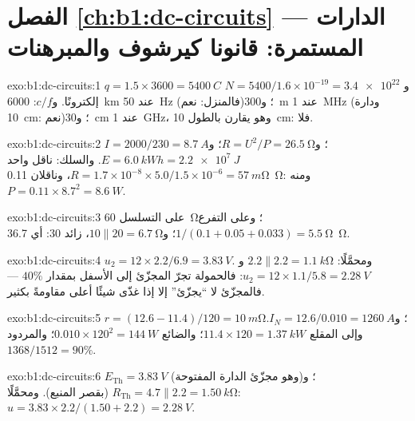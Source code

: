 \section*{الفصل \ref{ch:b1:dc-circuits} --- الدارات المستمرة: قانونا كيرشوف والمبرهنات}

\begin{solution}{exo:b1:dc-circuits:1}
$q = 1.5 \times 3600 = \qty{5400}{C}$ و $N = 5400/1.6\times10^{-19} =
\num{3.4e22}$ إلكترونًا. و$c/f$: \qty{6000}{km} عند \qty{50}{Hz} (فالمنزل:
نعم)؛ و\qty{300}{m} عند \qty{1}{MHz} (ودارة \qty{10}{cm}: نعم)؛
و\qty{30}{cm} عند \qty{1}{GHz}، وهو يقارن بالطول \qty{10}{cm}: فلا.
\end{solution}

\begin{solution}{exo:b1:dc-circuits:2}
$I = 2000/230 = \qty{8.7}{A}$؛ و$R = U^2/P = \qty{26.5}{\ohm}$؛ و$E =
\qty{6.0}{kWh} = \qty{2.2e7}{J}$. والسلك: ناقل واحد $R = 1.7\times10^{-8}
\times 5.0/1.5\times10^{-6} = \qty{57}{m\ohm}$، وناقلان
\qty{0.11}{\ohm}: ومنه $P = 0.11 \times 8.7^2 = \qty{8.6}{W}$.
\end{solution}

\begin{solution}{exo:b1:dc-circuits:3}
على التسلسل \qty{60}{\ohm}؛ وعلى التفرع $1/(0.1 + 0.05 + 0.033) = \qty{5.5}{\ohm}$؛
و$10 \parallel 20 = \qty{6.7}{\ohm}$، زائد $30$: أي \qty{36.7}{\ohm}.
\end{solution}

\begin{solution}{exo:b1:dc-circuits:4}
$u_2 = 12 \times 2.2/6.9 = \qty{3.83}{V}$. ومحمَّلًا: $2.2 \parallel 2.2 =
\qty{1.1}{k\ohm}$ و $u_2 = 12 \times 1.1/5.8 = \qty{2.28}{V}$: فالحمولة
تجرّ المجزّئ إلى الأسفل بمقدار $40\%$ --- فالمجزّئ لا ``يجزّئ'' إلا إذا
غذّى شيئًا أعلى مقاومةً بكثير.
\end{solution}

\begin{solution}{exo:b1:dc-circuits:5}
$r = (12.6 - 11.4)/120 = \qty{10}{m\ohm}$؛ و$I_N = 12.6/0.010 =
\qty{1260}{A}$. وإلى المقلع $11.4 \times 120 = \qty{1.37}{kW}$؛ والضائع
$0.010 \times 120^2 = \qty{144}{W}$؛ والمردود $1368/1512 = 90\%$.
\end{solution}

\begin{solution}{exo:b1:dc-circuits:6}
$E_{\mathrm{Th}} = \qty{3.83}{V}$ (وهو مجزّئ الدارة المفتوحة)؛ و$R_{\mathrm{Th}}
= 4.7 \parallel 2.2 = \qty{1.50}{k\ohm}$ (بقصر المنبع). ومحمَّلًا:
$u = 3.83 \times 2.2/(1.50 + 2.2) = \qty{2.28}{V}$.
\end{solution}

